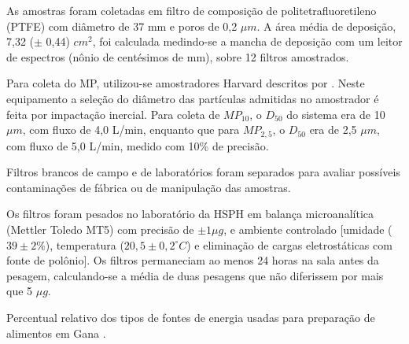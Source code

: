 As amostras foram coletadas em filtro de composição de politetrafluoretileno
(PTFE) com diâmetro de 37 mm e 
poros de 0,2 $\mu m$. A área média de deposição, 7,32 ($\pm$ 0,44) $cm^2$, 
foi calculada medindo-se a mancha de deposição com um leitor de espectros 
(nônio de centésimos de mm), sobre 12 filtros amostrados.

Para coleta do MP, utilizou-se amostradores Harvard descritos por 
\citet{marple1987}. Neste equipamento a seleção do diâmetro das partículas 
admitidas no amostrador é feita por impactação inercial. 
Para coleta de $MP_{10}$, o $D_{50}$ do sistema era de 10 $\mu m$, 
com fluxo de 4,0 L/min, enquanto que para $MP_{2,5}$, o $D_{50}$ 
era de 2,5 $\mu m$, com fluxo de 5,0 L/min, medido com 10\% de precisão. 

Filtros brancos de campo e de laboratórios foram separados para avaliar 
possíveis contaminações de fábrica ou de manipulação das amostras. 

Os filtros foram pesados no laboratório da HSPH em balança
microanalítica (Mettler Toledo MT5) com precisão de $\pm 1 \mu g$, 
e ambiente controlado [umidade ($39 \pm 2 \%$), 
temperatura ($20,5 \pm 0,2 ^{\circ} C$) e eliminação de cargas eletrostáticas 
com fonte de polônio]. Os filtros permaneciam ao menos 24 horas na sala 
antes da pesagem, calculando-se a média de duas pesagens que não diferissem 
por mais que 5 $\mu g$.

\begin{table}[H]
	\centering
	
	\caption{Percentual relativo dos tipos de fontes de energia usadas para preparação 
		    de alimentos em Gana \citeyearpar{ghanacensus2013}. 
		\label{table:cookfuel}}
\end{table}
